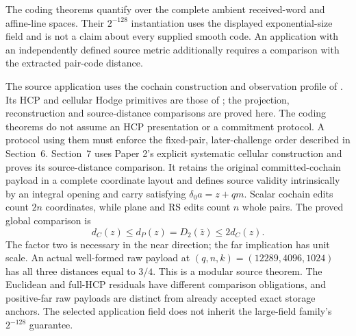 The coding theorems quantify over the complete ambient received-word and
affine-line spaces.  Their \(2^{-128}\) instantiation uses the displayed
exponential-size field and is not a claim about every supplied smooth code.
An application with an independently defined source metric additionally
requires a comparison with the extracted pair-code distance.

The source application uses the cochain construction and observation profile
of \cite{vanDerVlugt2026protocol}. Its HCP and cellular Hodge primitives
are those of \cite{vanDerVlugt2026hcp}; the projection, reconstruction
and source-distance comparisons are proved here.
The coding theorems do not assume an HCP presentation or a commitment
protocol. A protocol using them must enforce the fixed-pair, later-challenge
order described in Section~6. Section~7 uses Paper 2's explicit systematic
cellular construction and proves its source-distance comparison. It retains
the original committed-cochain payload in a complete coordinate
layout and defines source validity intrinsically by an integral opening and
carry satisfying \(\delta_0a=z+qm\). Scalar cochain edits count \(2n\)
coordinates, while plane and RS edits count \(n\) whole pairs. The proved
global comparison is
\[
  d_C(z)\le d_P(z)=D_2(\bar z)\le2d_C(z).
\]
The factor two is necessary in the near direction; the far implication has
unit scale. An actual well-formed raw payload at
\((q,n,k)=(12289,4096,1024)\) has all three distances equal to \(3/4\).
This is a modular source theorem. The Euclidean and full-HCP residuals have
different comparison obligations, and positive-far raw payloads are distinct
from already accepted exact storage anchors. The selected application field
does not inherit the large-field family's \(2^{-128}\) guarantee.

